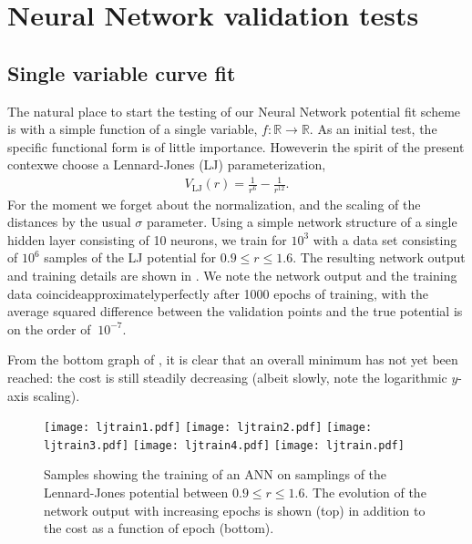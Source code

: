 \documentclass[../../master.tex]{subfiles}
\begin{document}
\chapter{Neural Network validation tests \label{NNvalidation}}
\section{Single variable curve fit}
The natural place to start the testing of our Neural Network potential fit scheme is with a simple function of a single variable, $f:\mathbb{R}\rightarrow\mathbb{R}$. As an initial test, the specific functional form is of little importance. However\textemdash in the spirit of the present contex\textemdash we choose a Lennard-Jones (LJ) parameterization,
\begin{align}
V_\text{LJ}(r) = \frac{1}{r^{6}}-\frac{1}{r^{12}}.
\end{align}
For the moment we forget about the normalization, and the scaling of the distances by the usual $\sigma$ parameter. Using a simple network structure of a single hidden layer consisting of 10 neurons, we train for $10^3$ with a data set consisting of $10^6$ samples of the LJ potential for $0.9\le r\le 1.6$. The resulting network output and training details are shown in . We note the network output and the training data coincide\textemdash approximately\textemdash perfectly after 1000 epochs of training, with the average squared difference between the validation points and the true potential is on the order of $~10^{-7}$. 

From the bottom graph of , it is clear that an overall minimum has not yet been reached: the cost is still steadily decreasing (albeit slowly, note the logarithmic $y$-axis scaling). 

\begin{figure}
\centering
\texttt{[image: ljtrain1.pdf]}
\texttt{[image: ljtrain2.pdf]}
\texttt{[image: ljtrain3.pdf]}
\texttt{[image: ljtrain4.pdf]}
\texttt{[image: ljtrain.pdf]}
\caption{Samples showing the training of an ANN on samplings of the Lennard-Jones potential between $0.9\le r \le 1.6$. The evolution of the network output with increasing epochs is shown (top) in addition to the cost as a function of epoch (bottom).  \label{fig:ljtrain}}
\end{figure}
\end{document}
